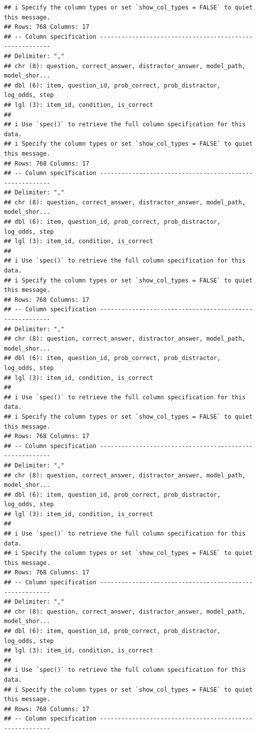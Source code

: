 \documentclass[
]{article}
\begin{document}
\begin{verbatim}
## i Specify the column types or set `show_col_types = FALSE` to quiet this message.
## Rows: 768 Columns: 17
## -- Column specification --------------------------------------------------------
## Delimiter: ","
## chr (8): question, correct_answer, distractor_answer, model_path, model_shor...
## dbl (6): item, question_id, prob_correct, prob_distractor, log_odds, step
## lgl (3): item_id, condition, is_correct
## 
## i Use `spec()` to retrieve the full column specification for this data.
## i Specify the column types or set `show_col_types = FALSE` to quiet this message.
## Rows: 768 Columns: 17
## -- Column specification --------------------------------------------------------
## Delimiter: ","
## chr (8): question, correct_answer, distractor_answer, model_path, model_shor...
## dbl (6): item, question_id, prob_correct, prob_distractor, log_odds, step
## lgl (3): item_id, condition, is_correct
## 
## i Use `spec()` to retrieve the full column specification for this data.
## i Specify the column types or set `show_col_types = FALSE` to quiet this message.
## Rows: 768 Columns: 17
## -- Column specification --------------------------------------------------------
## Delimiter: ","
## chr (8): question, correct_answer, distractor_answer, model_path, model_shor...
## dbl (6): item, question_id, prob_correct, prob_distractor, log_odds, step
## lgl (3): item_id, condition, is_correct
## 
## i Use `spec()` to retrieve the full column specification for this data.
## i Specify the column types or set `show_col_types = FALSE` to quiet this message.
## Rows: 768 Columns: 17
## -- Column specification --------------------------------------------------------
## Delimiter: ","
## chr (8): question, correct_answer, distractor_answer, model_path, model_shor...
## dbl (6): item, question_id, prob_correct, prob_distractor, log_odds, step
## lgl (3): item_id, condition, is_correct
## 
## i Use `spec()` to retrieve the full column specification for this data.
## i Specify the column types or set `show_col_types = FALSE` to quiet this message.
## Rows: 768 Columns: 17
## -- Column specification --------------------------------------------------------
## Delimiter: ","
## chr (8): question, correct_answer, distractor_answer, model_path, model_shor...
## dbl (6): item, question_id, prob_correct, prob_distractor, log_odds, step
## lgl (3): item_id, condition, is_correct
## 
## i Use `spec()` to retrieve the full column specification for this data.
## i Specify the column types or set `show_col_types = FALSE` to quiet this message.
## Rows: 768 Columns: 17
## -- Column specification --------------------------------------------------------

\end{verbatim}
\end{document}
